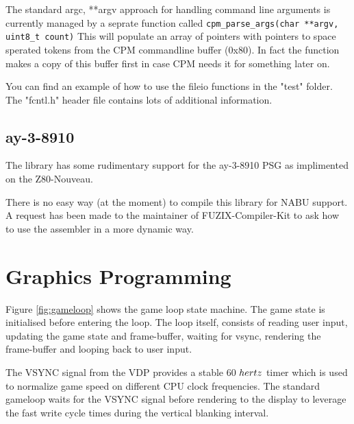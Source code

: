 \documentclass[10pt,a4paper,hidelinks]{article}
\begin{document}
The standard argc, **argv approach for handling command line arguments is
currently managed by a seprate function called \texttt{cpm\_parse\_args(char
**argv, uint8\_t count)}  This will populate an array of pointers with pointers
to space sperated tokens from the CPM commandline buffer (0x80).  In fact the
function makes a copy of this buffer first in case CPM needs it for something
later on.

You can find an example of how to use the fileio functions in the "test"
folder.  The "fcntl.h" header file contains lots of additional information.

\subsection{ay-3-8910}
The library has some rudimentary support for the ay-3-8910 PSG as implimented on
the Z80-Nouveau.

There is no easy way (at the moment) to compile this library for NABU support.
A request has been made to the maintainer of FUZIX-Compiler-Kit to ask how to
use the assembler in a more dynamic way.

\break
\section{Graphics Programming} \label{graphicsprogramming}

Figure \ref{fig:gameloop} shows the game loop state machine.  The game state is
initialised before entering the loop.  The loop itself, consists of reading user
input, updating the game state and frame-buffer, waiting for vsync, rendering
the frame-buffer and looping back to user input.

The VSYNC signal from the VDP provides a stable 60 ${\\hertz}$ timer which is
used to normalize game speed on different CPU clock frequencies.  The standard
gameloop waits for the VSYNC signal before rendering to the display to leverage
the fast write cycle times during the vertical blanking interval.
\end{document}
